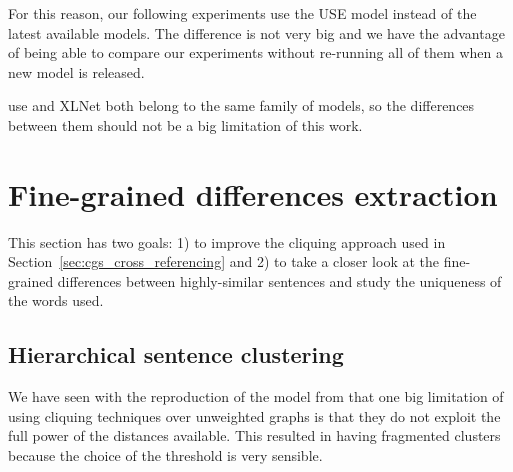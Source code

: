 For this reason, our following experiments use the USE model instead of the latest available models. The difference is not very big and we have the advantage of being able to compare our experiments without re-running all of them when a new model is released.

\acrshort{use} and XLNet both belong to the same family of models, so the differences between them should not be a big limitation of this work.




\section{\statusgreen Fine-grained differences extraction}
\label{sec:cgs_clustering_and_differences}

This section has two goals: 1) to improve the cliquing approach used in Section~\ref{sec:cgs_cross_referencing} and 2) to take a closer look at the fine-grained differences between highly-similar sentences and study the uniqueness of the words used.


\subsection{\statusgreen Hierarchical sentence clustering}
\label{sec:cgs_clustering_and_differences_hierarchical}


We have seen with the reproduction of the model from \citet{bountouridis2018explaining} that one big limitation of using cliquing techniques over unweighted graphs is that they do not exploit the full power of the distances available. This resulted in having fragmented clusters because the choice of the threshold is very sensible.


